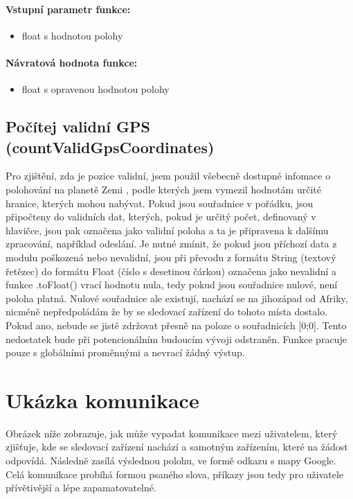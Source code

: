 \documentclass[FM,BP]{tulthesis}  %
\begin{document}
\paragraph{Vstupní parametr funkce:}
\begin{itemize}
\item float s hodnotou polohy
\end{itemize}

\paragraph{Návratová hodnota funkce:}
\begin{itemize}
\item float s opravenou hodnotou polohy
\end{itemize}

\subsection{Počítej validní GPS (countValidGpsCoordinates)}
Pro zjištění, zda je pozice validní, jsem použil všebecně dostupné infomace o polohování na planetě Zemi \cite{geographic}, podle kterých jsem vymezil hodnotám určité hranice, kterých mohou nabývat. Pokud jsou souřadnice v pořádku, jsou připočteny do validních dat, kterých, pokud je určitý počet, definovaný v hlavičce, jsou pak označena jako validní poloha a ta je připravena k dalšímu zpracování, například odeslání. Je nutné zmínit, že pokud jsou příchozí data z modulu poškozená nebo nevalidní, jsou při převodu z formátu String (textový řetězec) do formátu Float (číslo s desetinou čárkou) označena jako nevalidní a funkce .toFloat() vrací hodnotu nula, tedy pokud jsou souřadnice nulové, není poloha platná. Nulové souřadnice ale existují, nachází se na jihozápad od Afriky, nicméně nepředpoládám že by se sledovací zařízení do tohoto místa dostalo. Pokud ano, nebude se jistě zdržovat přesně na poloze o souřadnicích [0;0]. Tento nedostatek bude při potencionálním budoucím vývoji odstraněn. Funkce pracuje pouze s globálními proměnnými a nevrací žádný výstup.

\section{Ukázka komunikace}
Obrázek níže zobrazuje, jak může vypadat komunikace mezi uživatelem, který zjišťuje, kde se sledovací zařízení nachází a samotným zařízením, které na žádost odpovídá. Následně zasílá výslednou polohu, ve formě odkazu s mapy Google. Celá komunikace probíhá formou psaného slova, příkazy jsou tedy pro uživatele přívětivější a lépe zapamatovatelné.
\end{document}
